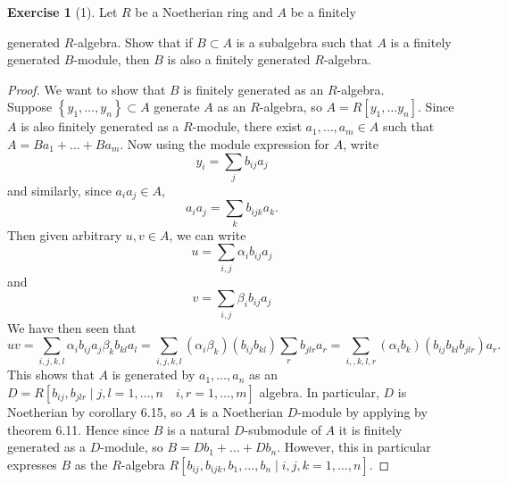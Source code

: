 \documentclass[reqno]{amsart}
\theoremstyle{definition}
\newtheorem{exercise}[theorem]{Exercise}
\theoremstyle{remark}
\begin{document}
    \begin{exercise}[1]
        Let $R$ be a Noetherian ring and $A$ be a finitely

        generated $R$-algebra. Show that if
        $B \subset A$ is a subalgebra such that $A$ is
        a finitely generated $B$-module, then
        $B$ is also a finitely generated
        $R$-algebra.
    \end{exercise}


    \begin{proof}
        We want to show that
        $B$ is finitely generated as an $R$-algebra.\\

        Suppose $\left\{ y_1, \ldots, y_n \right\} \subset A$ 
        generate $A$ as an $R$-algebra, so
        $A = R \left[ y_1, \ldots y_n \right] $.
        Since $A$ is also finitely generated
        as a $R$-module, there
        exist $a_1, \ldots, a_m \in A$ such that
        $A = Ba_1 + \ldots + Ba_m$.
        Now using the module expression for $A$, write
        \[
        y_i = \sum_j b_{ij} a_j
        \] 
        and similarly, since 
        $a_i a_j \in A$,
        \[
        a_i a_j = \sum_k b_{ijk} a_k.
        \] 
        Then given arbitrary
        $u,v \in A$, 
        we can write
        \[
        u = \sum_{i,j} \alpha_i b_{ij} a_{j}
        \] 
        and 
         \[
        v = \sum_{i,j} \beta_i b_{ij} a_{j}
        \] 
        We have then seen that
        \[
        uv = \sum_{i,j,k,l} \alpha_i b_{ij} a_j \beta_k b_{kl}a_l
        = \sum_{i,j,k,l} \left( \alpha_i \beta_k \right) 
        \left( b_{ij} b_{kl} \right) \sum_{r} b_{jlr} a_r
        = \sum_{i,,k,l,r} \left( \alpha_i b_{k} \right) 
        \left( b_{ij} b_{kl} b_{jlr} \right) a_r.
        \] 
        This shows that
        $A$ is generated by
        $a_1, \ldots, a_n$  as an
        $D = R \left[ b_{ij}, b_{jlr} \mid 
        j,l = 1,\ldots, n \quad
    i,r = 1,\ldots,m\right] $ algebra.
        In particular, $D$ is Noetherian by corollary
        6.15, so $A$ is a Noetherian
        $D$-module by applying by
        theorem 6.11. Hence
        since
        $B$ is a natural $D$-submodule of $A$ it is 
        finitely generated as a $D$-module, so
        $B = D b_1 + \ldots + D b_n$.
        However, this in particular expresses
        $B$ as the $R$-algebra
        $R \left[ b_{ij},b_{ijk}, b_1,\ldots, b_n
         \mid  i,j,k = 1, \ldots, n\right] $.

    \end{proof}
\end{document}
